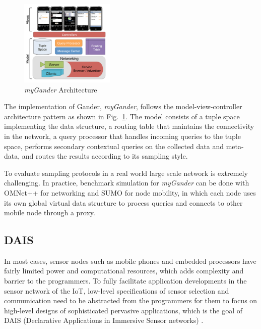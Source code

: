 \documentclass[11pt,onecolumn]{article}
\begin{document}
\begin{figure}
\vspace{-20pt}
  \begin{center}
    \includegraphics[width=0.4\textwidth]{resources/gander_architecture.png}
  \end{center}
  \vspace{-10pt}
  \caption{{\em myGander} Architecture \cite{michel2013gander} \label{gander_architecture}}
    \vspace{-20pt}
\end{figure}

The implementation of Gander, {\em myGander}\cite{michel2012mygander}, follows the model-view-controller architecture pattern as shown in Fig.~\ref{gander_architecture}. The model consists of a tuple space implementing the data structure, a routing table that maintains the connectivity in the network, a query processor that handles incoming queries to the tuple space, performs secondary contextual queries on the collected data and meta-data, and routes the results according to its sampling style.

To evaluate sampling protocols in a real world large scale network is extremely challenging. In practice, benchmark simulation for {\em myGander} can be done with OMNet++\cite{varga2001omnet++} for networking and SUMO\cite{krajzewicz2002sumo} for node mobility, in which each node uses its own global virtual data structure to process queries and connects to other mobile node through a proxy.

\subsection{DAIS}
In most cases, sensor nodes such as mobile phones and embedded processors have fairly limited power and computational resources, which adds complexity and barrier to the programmers. To fully facilitate application developments in the sensor network of the IoT, low-level specifications of sensor selection and communication need to be abstracted from the programmers for them to focus on high-level designs of sophisticated pervasive applications, which is the goal of DAIS (Declarative Applications in Immersive Sensor networks) \cite{dais}.
\end{document}
